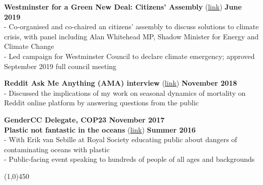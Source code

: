 \noindent \textbf{Westminster for a Green New Deal: Citizens' Assembly} 
(\href{https://bit.ly/2HjBxFi}{link}) \hfill \textbf{June 2019}\\
\noindent - Co-organised and co-chaired an citizens' assembly to discuss solutions to climate crisis, with panel including Alan Whitehead MP, Shadow Minister for Energy and Climate Change\\
- Led campaign for Westminster Council to declare climate emergency;  approved September 2019 full council meeting \medskip

\noindent \textbf{Reddit Ask Me Anything (AMA) interview} (\href{https://bit.ly/2Qcbu5E}{link}) \hfill \textbf{November 2018}	\\
\noindent - Discussed  the implications of my work on seasonal dynamics of mortality on Reddit online platform by answering questions from the public \medskip

\noindent \textbf{GenderCC Delegate, COP23 \hfill November 2017}	\\

\noindent \textbf{Plastic not fantastic in the oceans} (\href{https://bit.ly/2B3us5l}{link}) \hfill \textbf{Summer 2016}							\\
- With Erik van Sebille at Royal Society educating public about dangers of contaminating oceans with plastic\\
- Public-facing event speaking to hundreds of people of all ages and backgrounds

\begin{center} \line(1,0){450} \end{center}